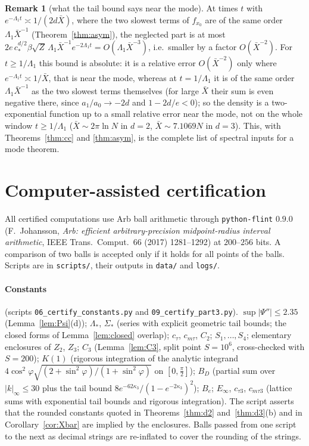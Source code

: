 \documentclass[11pt,a4paper]{article}
\newcommand{\Xb}{\bar X}
\theoremstyle{plain}
\theoremstyle{definition}
\newtheorem{remark}[theorem]{Remark}
\numberwithin{equation}{section}
\begin{document}
\begin{remark}[what the tail bound says near the mode]\label{rem:tailmode}
At times $t$ with $e^{-\Lambda_1t}\asymp1/(2d\Xb)$, where the two slowest terms of $f_{x_0}$ are of the same order $\Lambda_1\Xb^{-1}$ (Theorem~\ref{thm:asym}), the neglected part is at most $2e\,c_*^{d/2}\beta\sqrt Z\,\Lambda_1\Xb^{-1}e^{-2\Lambda_1t}=O(\Lambda_1\Xb^{-3})$, i.e.\ smaller by a factor $O(\Xb^{-2})$. For $t\ge1/\Lambda_1$ this bound is absolute: it is a relative error $O(\Xb^{-2})$ only where $e^{-\Lambda_1t}\asymp1/\Xb$, that is near the mode, whereas at $t=1/\Lambda_1$ it is of the same order $\Lambda_1\Xb^{-1}$ as the two slowest terms themselves (for large $\Xb$ their sum is even negative there, since $a_1/a_0\to-2d$ and $1-2d/e<0$); so the density is a two-exponential function up to a small relative error near the mode, not on the whole window $t\ge1/\Lambda_1$ ($\Xb\sim2\pi\ln N$ in $d=2$, $\Xb\sim7.1069N$ in $d=3$). This, with Theorems~\ref{thm:cc} and \ref{thm:asym}, is the complete list of spectral inputs for a mode theorem.
\end{remark}

\section{Computer-assisted certification}\label{sec:cert}

All certified computations use Arb ball arithmetic through \texttt{python-flint} $0.9.0$ (F.~Johansson, \emph{Arb: efficient arbitrary-precision midpoint-radius interval arithmetic}, IEEE Trans.\ Comput.\ 66 (2017) 1281--1292) at $200$--$256$ bits. A comparison of two balls is accepted only if it holds for all points of the balls. Scripts are in \texttt{scripts/}, their outputs in \texttt{data/} and \texttt{logs/}.

\paragraph{Constants} (scripts \texttt{06\_certify\_constants.py} and \texttt{09\_certify\_part3.py}).\enspace
$\sup|\Psi''|\le2.35$ (Lemma~\ref{lem:Psi}(d)); $\Lambda_*$, $\Sigma_*$ (series with explicit geometric tail bounds; the closed forms of Lemma~\ref{lem:closed} overlap); $c_\tau$, $c_{m\tau}$, $C_2$; $S_1,\dots,S_4$; elementary enclosures of $Z_2$, $Z_3$; $C_3$ (Lemma~\ref{lem:C3}, split point $S=10^6$, cross-checked with $S=200$); $K(1)$ (rigorous integration of the analytic integrand $4\cos^2\varphi\sqrt{(2+\sin^2\varphi)/(1+\sin^2\varphi)}$ on $[0,\frac\pi2]$); $B_D$ (partial sum over $|k|_\infty\le30$ plus the tail bound $8e^{-62\kappa_3}/(1-e^{-2\kappa_3})^2$); $B_e$; $E_\infty$, $c_{\tau3}$, $c_{m\tau3}$ (lattice sums with exponential tail bounds and rigorous integration). The script asserts that the rounded constants quoted in Theorems~\ref{thm:d2} and~\ref{thm:d3}(b) and in Corollary~\ref{cor:Xbar} are implied by the enclosures. Balls passed from one script to the next as decimal strings are re-inflated to cover the rounding of the strings.
\end{document}
